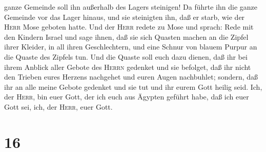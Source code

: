 ganze Gemeinde soll ihn außerhalb des Lagers steinigen! 
Da führte ihn die ganze Gemeinde vor das Lager hinaus, und sie
steinigten ihn, daß er starb, wie der \textsc{Herr} Mose geboten hatte.
 Und der \textsc{Herr} redete zu Mose und sprach:
 Rede mit den Kindern Israel und sage ihnen, daß sie sich
Quasten machen an die Zipfel ihrer Kleider, in all ihren Geschlechtern,
und eine Schnur von blauem Purpur an die Quaste des Zipfels tun.
 Und die Quaste soll euch dazu dienen, daß ihr bei ihrem
Anblick aller Gebote des \textsc{Herrn} gedenket und sie befolget, daß
ihr nicht den Trieben eures Herzens nachgehet und euren Augen
nachbuhlet;  sondern, daß ihr an alle meine Gebote
gedenket und sie tut und ihr eurem Gott heilig seid. 
Ich, der \textsc{Herr}, bin euer Gott, der ich euch aus Ägypten geführt
habe, daß ich euer Gott sei, ich, der \textsc{Herr}, euer Gott.

\hypertarget{section-15}{%
\section{16}\label{section-15}}

